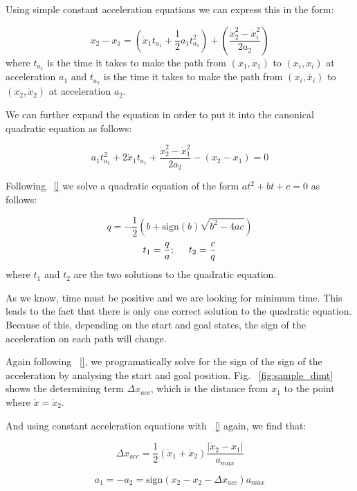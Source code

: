 \documentclass[letterpaper, 10 pt, conference]{ieeeconf}  %
\begin{document}
Using simple constant acceleration equations we can express this in the form:

\begin{equation}
x_2 - x_1 = \left(\dot{x}_1 t_{a_1} + \frac{1}{2} a_1 t_{a_1}^2\right) + \left(\frac{\dot{x}_2^2 - \dot{x}_i^2}{2a_2}\right)
\end{equation}
where $t_{a_1}$ is the time it takes to make the path from $\left(x_1, \dot{x}_1\right)$ to $\left(x_i, \dot{x}_i\right)$ at acceleration $a_1$ and $t_{a_2}$ is the time it takes to make the path from $\left(x_i, \dot{x_i}\right)$ to $\left(x_2, \dot{x}_2\right)$ at acceleration $a_2$.

We can further expand the equation in order to put it into the canonical quadratic equation as follows:

\begin{equation}
a_1 t_{a_1}^2 + 2 \dot{x}_1 t_{a_1} + \frac{\dot{x}_2^2 - \dot{x}_1^2}{2a_2} - \left(x_2 - x_1\right) = 0
\end{equation}

Following ~\ref{} we solve a quadratic equation of the form $at^2+bt+c=0$ as follows:

$$
q = -\frac{1}{2}\left(b + \text{sign}\left(b\right)\sqrt{b^2 - 4ac}\right)
$$
$$
t_1 = \frac{q}{a}; \hspace{5mm} t_2 = \frac{c}{q}
$$
where $t_1$ and $t_2$ are the two solutions to the quadratic equation.

As we know, time must be positive and we are looking for minimum time. This leads to the fact that there is only one correct solution to the quadratic equation. Because of this, depending on the start and goal states, the sign of the acceleration on each path will change.

Again following ~\ref{}, we programatically solve for the sign of the sign of the acceleration by analysing the start and goal position. Fig. ~\ref{fig:sample_dimt} shows the determining term $\Delta x_{acc}$, which is the distance from $x_1$ to the point where $\dot{x} = \dot{x}_2$. 

And using constant acceleration equations with ~\ref{} again, we find that:

\begin{equation}
\Delta x_{acc} = \frac{1}{2} \left(\dot{x}_1 + \dot{x}_2\right) \frac{|\dot{x}_2 - \dot{x}_1|}{a_{max}}
\end{equation}

\begin{equation}
a_1 = - a_2 = \text{sign}\left(x_2 - x_2 - \Delta x_{acc}\right) a_{max}
\end{equation}
\end{document}

